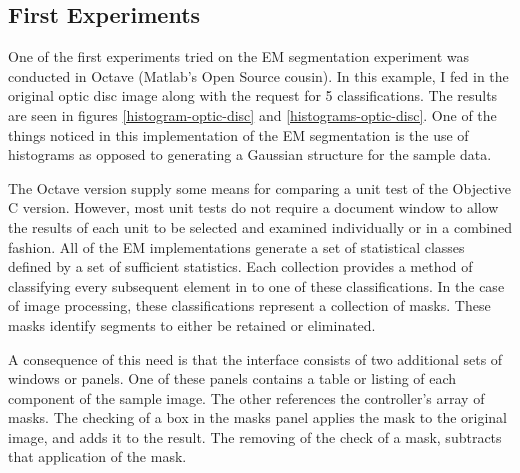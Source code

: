 \documentclass[12pt]{report}
\begin{document}
\subsection{First Experiments}

One of the first experiments tried on the EM segmentation experiment was conducted in Octave (Matlab's Open Source cousin).   In this example, I fed in the original optic disc image along with the request for 5 classifications.   The results are seen in figures \ref{histogram-optic-disc} and \ref{histograms-optic-disc}.  One of the things noticed in this implementation of the EM segmentation is the use of histograms as opposed to generating a Gaussian structure for the sample data. 

The Octave version supply some means for comparing a unit test of the Objective C version. 
However, most unit tests do not require a document window to allow the results of each unit to be selected and examined individually or in a combined fashion.  All of the EM implementations generate a set of statistical classes defined by a set of sufficient statistics.  Each collection provides a method of classifying every subsequent element in to one of these classifications.  In the case of image processing, these classifications represent a collection of masks.  These masks identify segments to either be retained or eliminated.  

A consequence of this need is that the interface consists of two additional sets of windows or panels.  One of these panels contains a table or listing of each component of the sample image.  The other references the controller's array of masks.  The checking of a box in the masks panel applies the mask to the original image, and adds it to the result.  The removing of the check of a mask, subtracts that application of the mask.  
\end{document}
